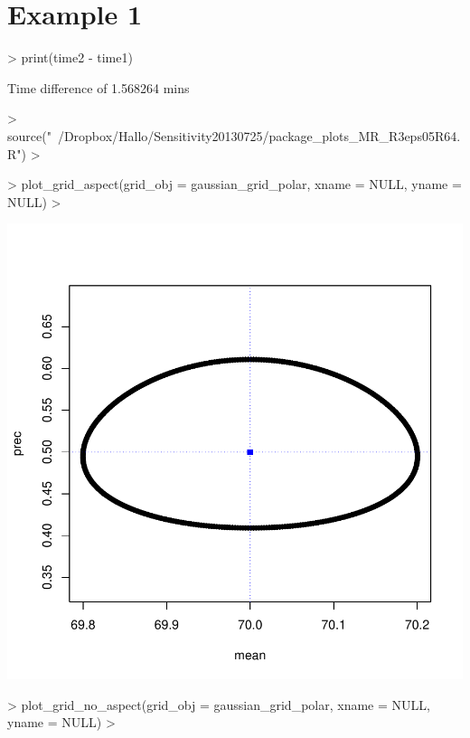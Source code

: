\documentclass{article}
\begin{document}


\section*{Example 1}

\begin{Schunk}
\begin{Sinput}
> print(time2 - time1)
\end{Sinput}
\begin{Soutput}
Time difference of 1.568264 mins
\end{Soutput}
\begin{Sinput}
> source("~/Dropbox/Hallo/Sensitivity20130725/package_plots_MR_R3eps05R64.R")
> 
\end{Sinput}
\end{Schunk}
\begin{Schunk}
\begin{Sinput}
> plot_grid_aspect(grid_obj = gaussian_grid_polar, xname = NULL, yname = NULL)
> 
\end{Sinput}
\end{Schunk}
\includegraphics{test_routines_0_0_1-003}
\begin{Schunk}
\begin{Sinput}
> plot_grid_no_aspect(grid_obj = gaussian_grid_polar, xname = NULL, yname = NULL)
> 
\end{Sinput}
\end{Schunk}
\end{document}
